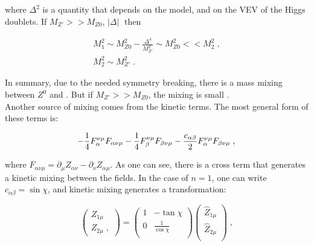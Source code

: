 \noindent where $\Delta^{2}$ is a quantity that depends on the model, and on the VEV of the 
Higgs doublets. If $M_{Z\prime} >> M_{Z 0}$, $|\Delta| \;$ then

\begin{equation}
\begin{split}
 M_{1}^{2} \sim M_{Z 0}^{2} - \frac{\Delta^{4}}{M_{Z\prime}^{2}} \sim M_{Z 0}^{2} << M_{2}^{2} \; , \\
 M_{2}^{2} \sim M_{Z\prime}^{2} \; .
\end{split}
\end{equation}

\noindent In summary, due to the needed symmetry breaking, there is a mass mixing between
$Z^{0}$ and \Zprime. But if $M_{Z\prime} >> M_{Z 0}$, the mixing is small \cite{ZprimeMixing}.\\

\noindent Another source of mixing comes from the kinetic terms. The most general form of these terms is:

\begin{equation}
-\frac{1}{4}F_{\alpha}^{\nu\mu}F_{\alpha\nu\mu} -\frac{1}{4}F_{\beta}^{\nu\mu}F_{\beta\nu\mu} -\frac{c_{\alpha\beta}}{2}F_{\alpha}^{\nu\mu}F_{\beta\nu\mu} \; , \\
\end{equation}

\noindent where $F_{\alpha\nu\mu} = \partial_{\mu}Z_{\alpha \nu} - \partial_{\nu}Z_{\alpha \mu}$. As one can see, there is a 
cross term that generates a kinetic mixing between the fields. In the case 
of $n = 1$,  one can write $c_{\alpha\beta} = \sin \chi$, and kinetic
mixing generates a transformation:

\begin{equation}
 \left(
 \begin{matrix}
  Z_{1 \mu}  \\
  Z_{2 \mu} \; ,
 \end{matrix}
\right)
 = 
\left(
 \begin{matrix}
  1    & -\tan \chi      \\
  0    & \frac{1}{\cos \chi} \\
 \end{matrix}
\right)
 \left(
 \begin{matrix}
  \hat{Z}_{1 \mu}  \\
  \hat{Z}_{2 \mu} \\
 \end{matrix}
\right) \; ,
 \end{equation}

